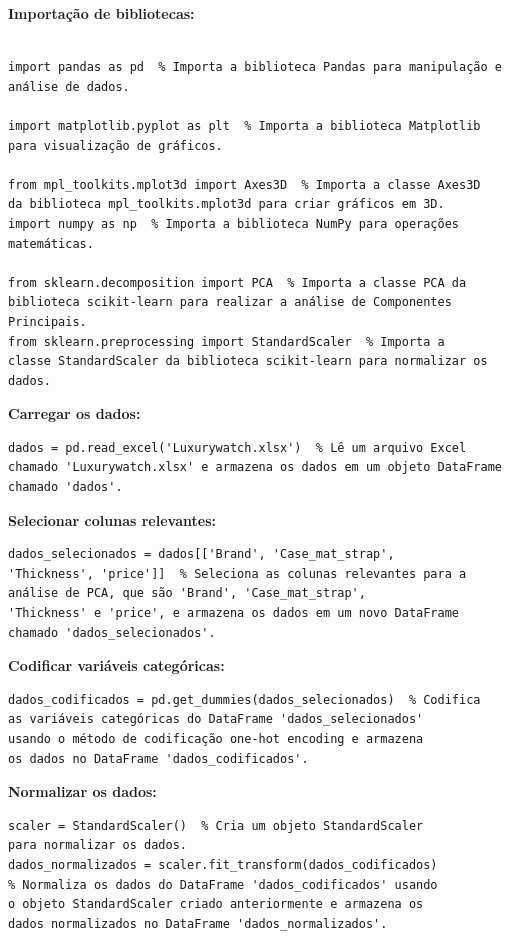 \documentclass[12pt, a4paper]{article}
\begin{document}
\begin{enumerate}
\textbf{Importação de bibliotecas:}

\begin{verbatim}

import pandas as pd  % Importa a biblioteca Pandas para manipulação e 
análise de dados.

import matplotlib.pyplot as plt  % Importa a biblioteca Matplotlib 
para visualização de gráficos.

from mpl_toolkits.mplot3d import Axes3D  % Importa a classe Axes3D 
da biblioteca mpl_toolkits.mplot3d para criar gráficos em 3D.
import numpy as np  % Importa a biblioteca NumPy para operações 
matemáticas.

from sklearn.decomposition import PCA  % Importa a classe PCA da 
biblioteca scikit-learn para realizar a análise de Componentes Principais.
from sklearn.preprocessing import StandardScaler  % Importa a 
classe StandardScaler da biblioteca scikit-learn para normalizar os dados.
\end{verbatim}

\textbf{Carregar os dados:}

\begin{verbatim}
dados = pd.read_excel('Luxurywatch.xlsx')  % Lê um arquivo Excel 
chamado 'Luxurywatch.xlsx' e armazena os dados em um objeto DataFrame 
chamado 'dados'.
\end{verbatim}

\textbf{Selecionar colunas relevantes:}

\begin{verbatim}
dados_selecionados = dados[['Brand', 'Case_mat_strap', 
'Thickness', 'price']]  % Seleciona as colunas relevantes para a 
análise de PCA, que são 'Brand', 'Case_mat_strap', 
'Thickness' e 'price', e armazena os dados em um novo DataFrame 
chamado 'dados_selecionados'.
\end{verbatim}

\textbf{Codificar variáveis categóricas:}

\begin{verbatim}
dados_codificados = pd.get_dummies(dados_selecionados)  % Codifica 
as variáveis categóricas do DataFrame 'dados_selecionados'
usando o método de codificação one-hot encoding e armazena 
os dados no DataFrame 'dados_codificados'.
\end{verbatim}

\textbf{Normalizar os dados:}

\begin{verbatim}
scaler = StandardScaler()  % Cria um objeto StandardScaler 
para normalizar os dados.
dados_normalizados = scaler.fit_transform(dados_codificados) 
% Normaliza os dados do DataFrame 'dados_codificados' usando 
o objeto StandardScaler criado anteriormente e armazena os 
dados normalizados no DataFrame 'dados_normalizados'.
\end{verbatim}


\end{enumerate}
\end{document}
